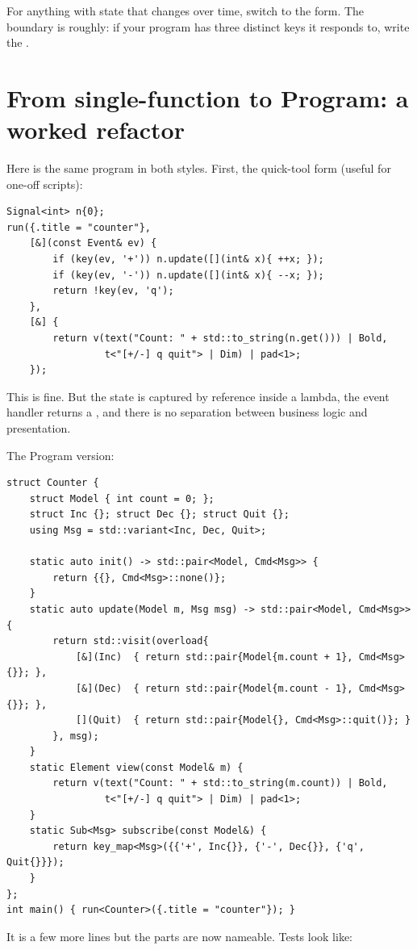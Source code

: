 For anything with state that changes over time, switch to the
 form. The boundary is roughly: if your program has
three distinct keys it responds to, write the .

\section{From single-function to Program: a worked refactor}

Here is the same program in both styles. First, the quick-tool form
(useful for one-off scripts):

\begin{lstlisting}
Signal<int> n{0};
run({.title = "counter"},
    [&](const Event& ev) {
        if (key(ev, '+')) n.update([](int& x){ ++x; });
        if (key(ev, '-')) n.update([](int& x){ --x; });
        return !key(ev, 'q');
    },
    [&] {
        return v(text("Count: " + std::to_string(n.get())) | Bold,
                 t<"[+/-] q quit"> | Dim) | pad<1>;
    });
\end{lstlisting}

This is fine. But the state is captured by reference inside a lambda,
the event handler returns a , and there is no separation
between business logic and presentation.

The Program version:

\begin{lstlisting}
struct Counter {
    struct Model { int count = 0; };
    struct Inc {}; struct Dec {}; struct Quit {};
    using Msg = std::variant<Inc, Dec, Quit>;

    static auto init() -> std::pair<Model, Cmd<Msg>> {
        return {{}, Cmd<Msg>::none()};
    }
    static auto update(Model m, Msg msg) -> std::pair<Model, Cmd<Msg>> {
        return std::visit(overload{
            [&](Inc)  { return std::pair{Model{m.count + 1}, Cmd<Msg>{}}; },
            [&](Dec)  { return std::pair{Model{m.count - 1}, Cmd<Msg>{}}; },
            [](Quit)  { return std::pair{Model{}, Cmd<Msg>::quit()}; }
        }, msg);
    }
    static Element view(const Model& m) {
        return v(text("Count: " + std::to_string(m.count)) | Bold,
                 t<"[+/-] q quit"> | Dim) | pad<1>;
    }
    static Sub<Msg> subscribe(const Model&) {
        return key_map<Msg>({{'+', Inc{}}, {'-', Dec{}}, {'q', Quit{}}});
    }
};
int main() { run<Counter>({.title = "counter"}); }
\end{lstlisting}

It is a few more lines but the parts are now nameable. Tests look
like:

